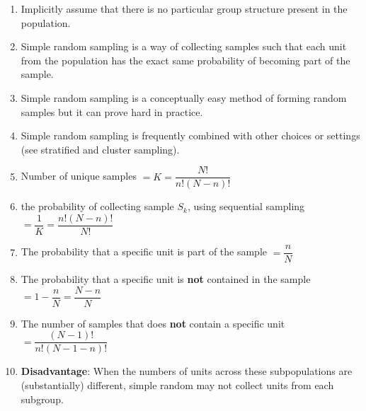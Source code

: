 \begin{enumerate}[itemsep=0.2cm]
    \item Implicitly assume that there is no particular group structure present in the population.
    \hfill \cite{statistics/book/Statistics-for-Data-Scientists/Maurits-Kaptein}
    
    \item Simple random sampling is a way of collecting samples such that each unit from the population has the exact same probability of becoming part of the sample. 
    \hfill \cite{statistics/book/Statistics-for-Data-Scientists/Maurits-Kaptein}

    
    \item Simple random sampling is a conceptually easy method of forming random samples but it can prove hard in practice.
    \hfill \cite{statistics/book/Statistics-for-Data-Scientists/Maurits-Kaptein}

    \item Simple random sampling is frequently combined with other choices or settings (see stratified and cluster sampling).
    \hfill \cite{statistics/book/Statistics-for-Data-Scientists/Maurits-Kaptein}

    \item Number of unique samples $
        = K 
        = \dfrac{N!}{n!(N-n)!}
    $
    \hfill \cite{statistics/book/Statistics-for-Data-Scientists/Maurits-Kaptein}

    \item the probability of collecting sample $S_k$, using sequential sampling $
        = \dfrac{1}{K} 
        = \dfrac{n!(N-n)!}{N!}
    $
    \hfill \cite{statistics/book/Statistics-for-Data-Scientists/Maurits-Kaptein}

    \item The probability that a specific unit is part of the sample $
        = \dfrac{n}{N}
    $
    \hfill \cite{statistics/book/Statistics-for-Data-Scientists/Maurits-Kaptein}

    \item The probability that a specific unit is \textbf{not} contained in the sample $
        = 1 - \dfrac{n}{N}
        = \dfrac{N-n}{N}
    $
    \hfill \cite{statistics/book/Statistics-for-Data-Scientists/Maurits-Kaptein}

    \item The number of samples that does \textbf{not} contain a specific unit $
        = \dfrac{(N - 1)!}{n!(N - 1 - n)!}
    $
    \hfill \cite{statistics/book/Statistics-for-Data-Scientists/Maurits-Kaptein}

    \item \textbf{Disadvantage}: When the numbers of units across these subpopulations are (substantially) different, simple random may not collect units from each subgroup.
    \hfill \cite{statistics/book/Statistics-for-Data-Scientists/Maurits-Kaptein}
    
\end{enumerate}

